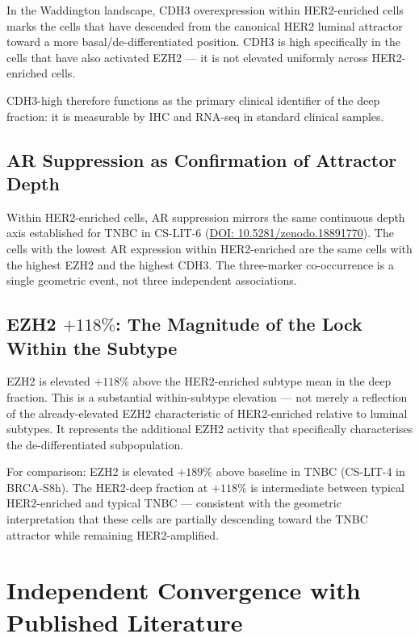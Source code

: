 \documentclass[12pt, a4paper]{article}
\begin{document}
In the Waddington landscape, CDH3
overexpression within HER2-enriched cells
marks the cells that have descended from the
canonical HER2 luminal attractor toward
a more basal/de-differentiated position.
CDH3 is high specifically in the cells that
have also activated EZH2 --- it is not
elevated uniformly across HER2-enriched
cells.

CDH3-high therefore functions as the primary
clinical identifier of the deep fraction:
it is measurable by IHC and RNA-seq in
standard clinical samples.

\subsection{AR Suppression as Confirmation
of Attractor Depth}

Within HER2-enriched cells, AR suppression
mirrors the same continuous depth axis
established for TNBC in CS-LIT-6
(\href{https://doi.org/10.5281/zenodo.18891770}
{DOI: 10.5281/zenodo.18891770}). The cells
with the lowest AR expression within
HER2-enriched are the same cells with the
highest EZH2 and the highest CDH3. The
three-marker co-occurrence is a single
geometric event, not three independent
associations.

\subsection{\texorpdfstring{EZH2 $+118\%$:
The Magnitude of the Lock Within the
Subtype}{EZH2 +118 Percent: The Magnitude
of the Lock}}

EZH2 is elevated $+118\%$ above the
HER2-enriched subtype mean in the deep
fraction. This is a substantial within-subtype
elevation --- not merely a reflection of
the already-elevated EZH2 characteristic
of HER2-enriched relative to luminal subtypes.
It represents the additional EZH2 activity
that specifically characterises the
de-differentiated subpopulation.

For comparison: EZH2 is elevated $+189\%$
above baseline in TNBC (CS-LIT-4 in BRCA-S8h).
The HER2-deep fraction at $+118\%$ is
intermediate between typical HER2-enriched
and typical TNBC --- consistent with the
geometric interpretation that these cells
are partially descending toward the TNBC
attractor while remaining HER2-amplified.

\section{Independent Convergence with Published
Literature}
\end{document}
